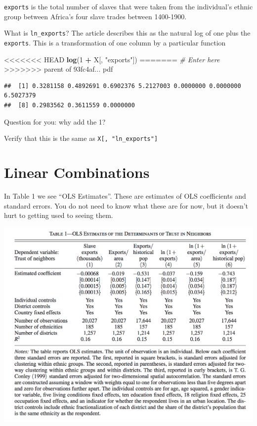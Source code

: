 \documentclass[]{book}
\newenvironment{Shaded}{\begin{snugshade}}{\end{snugshade}}
\newcommand{\CommentTok}[1]{\textcolor[rgb]{0.56,0.35,0.01}{\textit{#1}}}
\newcommand{\DecValTok}[1]{\textcolor[rgb]{0.00,0.00,0.81}{#1}}
\newcommand{\KeywordTok}[1]{\textcolor[rgb]{0.13,0.29,0.53}{\textbf{#1}}}
\newcommand{\NormalTok}[1]{#1}
\newcommand{\OperatorTok}[1]{\textcolor[rgb]{0.81,0.36,0.00}{\textbf{#1}}}
\newcommand{\StringTok}[1]{\textcolor[rgb]{0.31,0.60,0.02}{#1}}
\theoremstyle{definition}
\theoremstyle{definition}
\theoremstyle{definition}
\theoremstyle{remark}
\begin{document}
\begin{Shaded}
\begin{Highlighting}[]
\begin{Shaded}
\begin{Highlighting}[]
\texttt{exports} is the total number of slaves that were taken from the individual's ethnic group between Africa's four slave trades between 1400-1900.

What is \texttt{ln\_exports}? The article describes this as the natural log of one plus the \texttt{exports}. This is a transformation of one column by a particular function

\begin{Shaded}
\begin{Highlighting}[]
<<<<<<< HEAD
\KeywordTok{log}\NormalTok{(}\DecValTok{1} \OperatorTok{+}\StringTok{ }\NormalTok{X[, }\StringTok{"exports"}\NormalTok{])}
=======
\CommentTok{# Enter here}
>>>>>>> parent of 93fc4af... pdf
\end{Highlighting}
\end{Shaded}

\begin{verbatim}
##  [1] 0.3281158 0.4892691 0.6902376 5.2127003 0.0000000 0.0000000 6.5027379
##  [8] 0.2983562 0.3611559 0.0000000
\end{verbatim}

Question for you: why add the 1?

Verify that this is the same as \texttt{X{[},\ "ln\_exports"{]}}

\hypertarget{linear-combinations}{%
\section{Linear Combinations}\label{linear-combinations}}

In Table 1 we see ``OLS Estimates''. These are estimates of OLS coefficients and standard errors. You do not need to know what these are for now, but it doesn't hurt to getting used to seeing them.

\includegraphics{images/nunn_wantchekon_table1.png}


\end{Highlighting}
\end{Shaded}
\end{Highlighting}
\end{Shaded}
\end{document}
